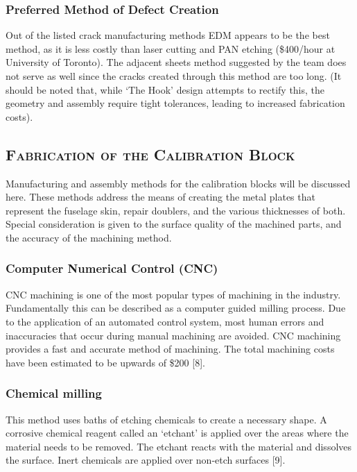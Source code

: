 \documentclass[12pt]{article}
\begin{document}
\subsubsection{Preferred Method of Defect Creation}

Out of the listed crack manufacturing methods EDM appears to be the best method, as it is less costly than laser cutting and PAN etching (\$400/hour at University of Toronto). The adjacent sheets method suggested by the team does not serve as well since the cracks created through this method are too long. (It should be noted that, while `The Hook' design attempts to rectify this, the geometry and assembly require tight tolerances, leading to increased fabrication costs).


\subsection{\textsc{Fabrication of the Calibration Block}}
Manufacturing and assembly methods for the calibration blocks will be discussed here. These methods address the means of creating the metal plates that represent the fuselage skin, repair doublers, and the various thicknesses of both.  Special consideration is given to the surface quality of the machined parts, and the accuracy of the machining method. 

\subsubsection{Computer Numerical Control (CNC)}
CNC machining is one of the most popular types of machining in the industry. Fundamentally this can be described as a computer guided milling process. Due to the application of an automated control system, most human errors and inaccuracies that occur during manual machining are avoided. CNC machining provides a fast and accurate method of machining. The total machining costs have been estimated to be upwards of \$200 [8].  

\subsubsection{Chemical milling}
This method uses baths of etching chemicals to create a necessary shape. A corrosive chemical reagent called an `etchant' is applied over the areas where the material needs to be removed. The etchant reacts with the material and dissolves the surface. Inert chemicals are applied over non-etch surfaces [9].
\end{document}

